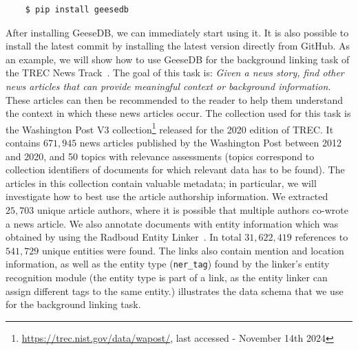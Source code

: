 \begin{verbatim}
	$ pip install geesedb
\end{verbatim}
After installing GeeseDB, we can immediately start using it. It is also possible to install the latest commit by installing the latest version directly from GitHub.
As an example, we will show how to use GeeseDB for the background linking task of the TREC News Track~\citep{soboroff2018trec}. The goal of this task is: \textit{Given a news story, find other news articles that can provide meaningful context or background information.} These articles can then be recommended to the reader to help them understand the context in which these news articles occur. The collection used for this task is the Washington Post V3 collection\footnote{\url{https://trec.nist.gov/data/wapost/}, last accessed - November 14th 2024} released for the 2020 edition of TREC. It contains $671,945$ news articles published by the Washington Post between 2012 and 2020, and 50 topics with relevance assessments (topics correspond to collection identifiers of documents for which relevant data has to be found). The articles in this collection contain valuable metadata; in particular, we will investigate how to best use the article authorship information. We extracted $25,703$ unique article authors, where it is possible that multiple authors co-wrote a news article. We also annotate documents with entity information which was obtained by using the Radboud Entity Linker~\citep{rel}. In total $31,622,419$ references to $541,729$ unique entities were found. The links also contain mention and location information, as well as the entity type (\texttt{ner\_tag}) found by the linker's entity recognition module (the entity type is part of a link, as the entity linker can assign different tags to the same entity.)  illustrates the data schema that we use for the background linking task. 


